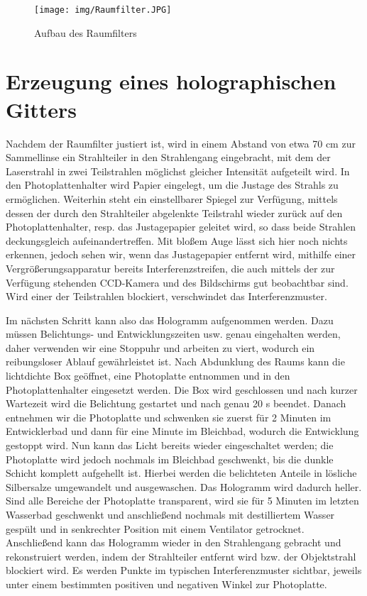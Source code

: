 \documentclass[bigchapter,colorback,accentcolor=tud4b,linedtoc,11pt]{tudreport}
\begin{document}
\begin{figure}[H]
\centering
\texttt{[image: img/Raumfilter.JPG]}
\caption{Aufbau des Raumfilters}
\end{figure}

\section{Erzeugung eines holographischen Gitters}

Nachdem der Raumfilter justiert ist, wird in einem Abstand von etwa 70 cm zur Sammellinse ein Strahlteiler in den Strahlengang eingebracht, mit dem der Laserstrahl in zwei Teilstrahlen möglichst gleicher Intensität aufgeteilt wird. In den Photoplattenhalter wird Papier eingelegt, um die Justage des Strahls zu ermöglichen. Weiterhin steht ein einstellbarer Spiegel zur Verfügung, mittels dessen der durch den Strahlteiler abgelenkte Teilstrahl wieder zurück auf den Photoplattenhalter, resp. das Justagepapier geleitet wird, so dass beide Strahlen deckungsgleich aufeinandertreffen. Mit bloßem Auge lässt sich hier noch nichts erkennen, jedoch sehen wir, wenn das Justagepapier entfernt wird, mithilfe einer Vergrößerungsapparatur bereits Interferenzstreifen, die auch mittels der zur Verfügung stehenden CCD-Kamera und des Bildschirms gut beobachtbar sind. Wird einer der Teilstrahlen blockiert, verschwindet das Interferenzmuster.

Im nächsten Schritt kann also das Hologramm aufgenommen werden. Dazu müssen Belichtungs- und Entwicklungszeiten usw. genau eingehalten werden, daher verwenden wir eine Stoppuhr und arbeiten zu viert, wodurch ein reibungsloser Ablauf gewährleistet ist. Nach Abdunklung des Raums kann die lichtdichte Box geöffnet, eine Photoplatte entnommen und in den Photoplattenhalter eingesetzt werden. Die Box wird geschlossen und nach kurzer Wartezeit wird die Belichtung gestartet und nach genau 20 s beendet. Danach entnehmen wir die Photoplatte und schwenken sie zuerst für 2 Minuten im Entwicklerbad und dann für eine Minute im Bleichbad, wodurch die Entwicklung gestoppt wird. Nun kann das Licht bereits wieder eingeschaltet werden; die Photoplatte wird jedoch nochmals im Bleichbad geschwenkt, bis die dunkle Schicht komplett aufgehellt ist. Hierbei werden die belichteten Anteile in lösliche Silbersalze umgewandelt und ausgewaschen. Das Hologramm wird dadurch heller. Sind alle Bereiche der Photoplatte transparent, wird sie für 5 Minuten im letzten Wasserbad geschwenkt und anschließend nochmals mit destilliertem Wasser gespült und in senkrechter Position mit einem Ventilator getrocknet. Anschließend kann das Hologramm wieder in den Strahlengang gebracht und rekonstruiert werden, indem der Strahlteiler entfernt wird bzw. der Objektstrahl blockiert wird. Es werden Punkte im typischen Interferenzmuster sichtbar, jeweils unter einem bestimmten positiven und negativen Winkel zur Photoplatte.
\end{document}
